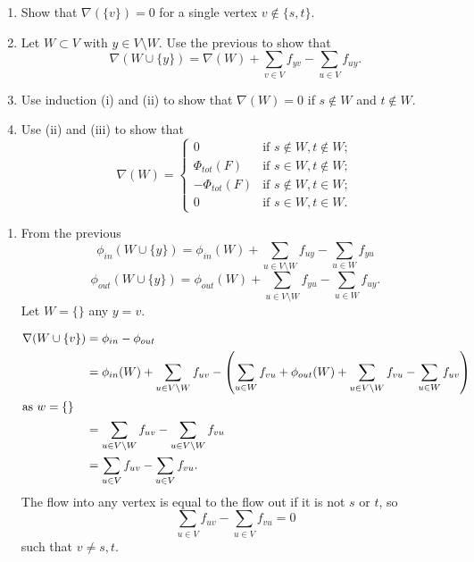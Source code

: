 \documentclass[10pt, a4paper]{article}
\begin{document}
\begin{example}\phantom{}
    \begin{enumerate}[label = (\roman*)]
        \item Show that $\nabla(\{v\}) = 0$ for a single vertex $v \notin \{s, t\}$.

        \item Let $W \subset V$ with $y \in V \setminus W$.
        Use the previous to show that
        \[
        \nabla(W \cup \{y\}) = \nabla(W) + \sum_{v \in V}f_{yv} - \sum_{u \in V}f_{uy}.
        \]

        \item Use induction (i) and (ii) to show that $\nabla(W) = 0$ if $s \notin W$ and $t \notin W$.

        \item Use (ii) and (iii) to show that
        \[
        \nabla(W) = \begin{cases}
            0 & \text{if } s \notin W, t \notin W; \\
            \Phi_{tot}(F) & \text{if } s \in W, t \notin W; \\
            -\Phi_{tot}(F) & \text{if } s \notin W, t \in W; \\
            0 & \text{if } s \in W, t \in W.
        \end{cases}
        \]
    \end{enumerate}

    \begin{solution}\phantom{}
        \begin{enumerate}[label = (\roman*)]
            \item
            From the previous
            \[
            \phi_{in}(W \cup \{y\}) = \phi_{in}(W) + \sum_{u \in V \setminus W}f_{uy} - \sum_{u \in W}f_{yu}
            \]
            \[
            \phi_{out}(W \cup \{y\}) = \phi_{out}(W) + \sum_{u \in V \setminus W}f_{yu} - \sum_{u \in W}f_{uy}.
            \]
            Let $W = \{\}$ any $y = v$.

            \begin{align*}
                \nabla(W \cup \{v\}) &= \phi_{in} - \phi_{out} \\
                &= \phi_{in}(W) + \sum_{u \in V \setminus W}f_{uv} - \left(\sum_{u \in W}f_{vu} + \phi_{out}(W) + \sum_{u \in V \setminus W}f_{vu} - \sum_{u \in W}f_{uv}\right) \\
                \intertext{as $w = \{\}$}
                &= \sum_{u \in V \setminus W}f_{uv} - \sum_{u \in V \setminus W}f_{vu} \\
                &= \sum_{u \in V}f_{uv} - \sum_{u \in V}f_{vu}.
            \end{align*}
            The flow into any vertex is equal to the flow out if it is not $s$ or $t$,
            so
            \[
            \sum_{u \in V}f_{uv} - \sum_{u \in V}f_{vu} = 0
            \]
            such that $v \neq s, t$.


\end{enumerate}
\end{solution}
\end{example}
\end{document}
